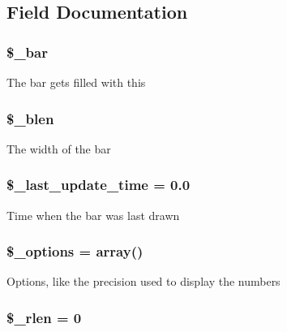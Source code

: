 \subsection{Field Documentation}
\hypertarget{class_console___progress_bar_a7104ad343e5944c4dfa9f3fd486059bf}{
\subsubsection[{\$\_\-bar}]{\setlength{\rightskip}{0pt plus 5cm}\$\_\-bar}}
\label{class_console___progress_bar_a7104ad343e5944c4dfa9f3fd486059bf}
The bar gets filled with this \hypertarget{class_console___progress_bar_ac92b0778b77da2fda833d62731acd4ab}{
\subsubsection[{\$\_\-blen}]{\setlength{\rightskip}{0pt plus 5cm}\$\_\-blen}}
\label{class_console___progress_bar_ac92b0778b77da2fda833d62731acd4ab}
The width of the bar \hypertarget{class_console___progress_bar_a829fe81e3f4651e2175b7963beaeecf3}{
\subsubsection[{\$\_\-last\_\-update\_\-time}]{\setlength{\rightskip}{0pt plus 5cm}\$\_\-last\_\-update\_\-time = 0.0}}
\label{class_console___progress_bar_a829fe81e3f4651e2175b7963beaeecf3}
Time when the bar was last drawn \hypertarget{class_console___progress_bar_a1bebdc689c84eee59ad24c77e5531762}{
\subsubsection[{\$\_\-options}]{\setlength{\rightskip}{0pt plus 5cm}\$\_\-options = array()}}
\label{class_console___progress_bar_a1bebdc689c84eee59ad24c77e5531762}
Options, like the precision used to display the numbers \hypertarget{class_console___progress_bar_a9aa5141c3490e6a764486f24c4310688}{
\subsubsection[{\$\_\-rlen}]{\setlength{\rightskip}{0pt plus 5cm}\$\_\-rlen = 0}}
